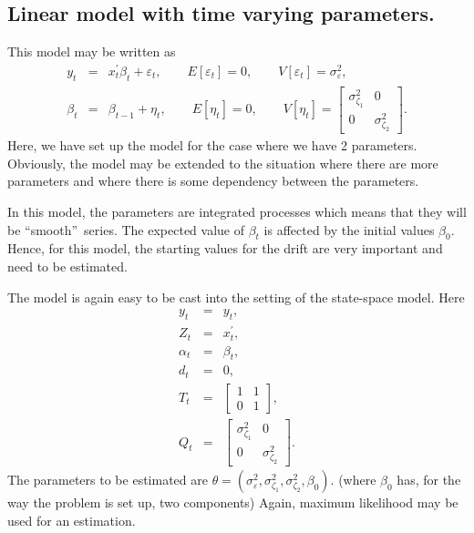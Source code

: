 \documentclass[12pt,a4paper]{article}
\begin{document}
\subsection{Linear model with time varying parameters.}

This model may be written as%
\begin{eqnarray*}
y_{t} &=&x_{t}^{\prime }\beta _{t}+\varepsilon _{t},\qquad E[\varepsilon
_{t}]=0,\qquad V[\varepsilon _{t}]=\sigma _{\varepsilon }^{2}, \\
\beta _{t} &=&\beta _{t-1}+\eta _{t},\qquad E[\eta _{t}]=0,\qquad V[\eta
_{t}]=\left[
\begin{array}{cc}
\sigma _{\zeta _{1}}^{2} & 0 \\
0 & \sigma _{\zeta _{2}}^{2}%
\end{array}%
\right] .
\end{eqnarray*}
Here, we have set up the model for the case where we have 2
parameters. Obviously, the model may be extended to the situation
where there are more parameters and where there is some dependency
between the parameters.

In this model, the parameters are integrated processes which means that they
will be ``smooth\textquotedblright\ series. The expected value of $\beta
_{t} $ is affected by the initial values $\beta _{0}$. Hence, for this
model, the starting values for the drift are very important and need to be
estimated.

The model is again easy to be cast into the setting of the state-space
model. Here%
\begin{eqnarray*}
y_{t} &=&y_{t}, \\
Z_{t} &=&x_{t}^{\prime }, \\
\alpha _{t} &=&\beta _{t}, \\
d_{t} &=&0, \\
T_{t} &=&\left[
\begin{array}{cc}
1 & 1 \\
0 & 1%
\end{array}%
\right] , \\
Q_{t} &=&\left[
\begin{array}{cc}
\sigma _{\zeta _{1}}^{2} & 0 \\
0 & \sigma _{\zeta _{2}}^{2}%
\end{array}%
\right] .
\end{eqnarray*}
The parameters to be estimated are $\theta =(\sigma _{\varepsilon
}^{2},\sigma _{\zeta _{1}}^{2},\sigma _{\zeta _{2}}^{2},\beta _{0})$. (where
$\beta _{0}$ has, for the way the problem is set up, two components) Again,
maximum likelihood may be used for an estimation.
\end{document}
